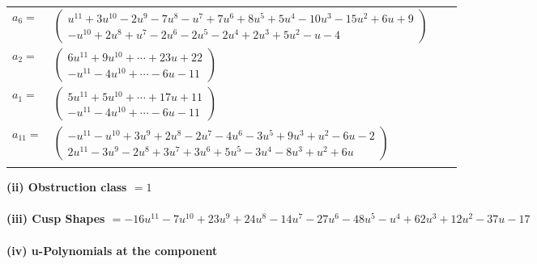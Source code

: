 \documentclass[1p]{elsarticle_modified}
\theoremstyle{definition}
\begin{document}
\begin{tabular}{m{7pt} m{180pt} m{7pt} m{180pt} }
\flushright $a_{6}=$&$\begin{pmatrix}u^{11}+3 u^{10}-2 u^9-7 u^8- u^7+7 u^6+8 u^5+5 u^4-10 u^3-15 u^2+6 u+9\\- u^{10}+2 u^8+u^7-2 u^6-2 u^5-2 u^4+2 u^3+5 u^2- u-4\end{pmatrix}$ \\
\flushright $a_{2}=$&$\begin{pmatrix}6 u^{11}+9 u^{10}+\cdots+23 u+22\\- u^{11}-4 u^{10}+\cdots-6 u-11\end{pmatrix}$ \\
\flushright $a_{1}=$&$\begin{pmatrix}5 u^{11}+5 u^{10}+\cdots+17 u+11\\- u^{11}-4 u^{10}+\cdots-6 u-11\end{pmatrix}$ \\
\flushright $a_{11}=$&$\begin{pmatrix}- u^{11}- u^{10}+3 u^9+2 u^8-2 u^7-4 u^6-3 u^5+9 u^3+u^2-6 u-2\\2 u^{11}-3 u^9-2 u^8+3 u^7+3 u^6+5 u^5-3 u^4-8 u^3+u^2+6 u\end{pmatrix}$\\&\end{tabular}
\flushleft \textbf{(ii) Obstruction class $= 1$}\\~\\
\flushleft \textbf{(iii) Cusp Shapes $= -16 u^{11}-7 u^{10}+23 u^9+24 u^8-14 u^7-27 u^6-48 u^5- u^4+62 u^3+12 u^2-37 u-17$}\\~\\
\newpage\renewcommand{\arraystretch}{1}
\flushleft \textbf{(iv) u-Polynomials at the component}\newline \\
\end{document}
